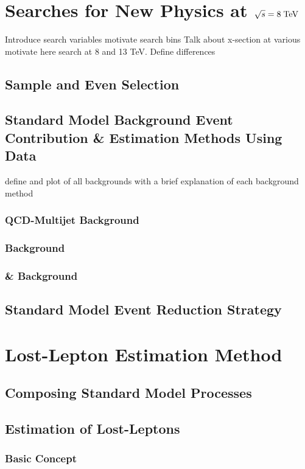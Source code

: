 \chapter{Searches for New Physics at $\sqrt{s}=8 \;\text{Te}\kern-0.06667em\text{V}$}
\label{sec:SUSY_Search_8TeV_Intro}
\todo Introduce search variables motivate search bins
\todo Talk about x-section at various \CM motivate here search at 8 and 13 TeV. Define differences
\section{Sample and Even Selection}
\section{Standard Model Background Event Contribution \& Estimation Methods Using Data}
\label{sec:SUSY_Search_8TeV_SM_BackGrounds}
\todo define and plot of all backgrounds with a brief explanation of each background method
\subsection{QCD-Multijet Background}
\subsection{\ZInv Background}
\subsection{\wpj \& \ttbar Background}
\section{Standard Model Event Reduction Strategy}


\chapter{Lost-Lepton Estimation Method}
\label{sec:Lost_Lepton_8TeV}


\section{Composing Standard Model Processes}



\section{Estimation of Lost-Leptons}
\subsection{Basic Concept}
